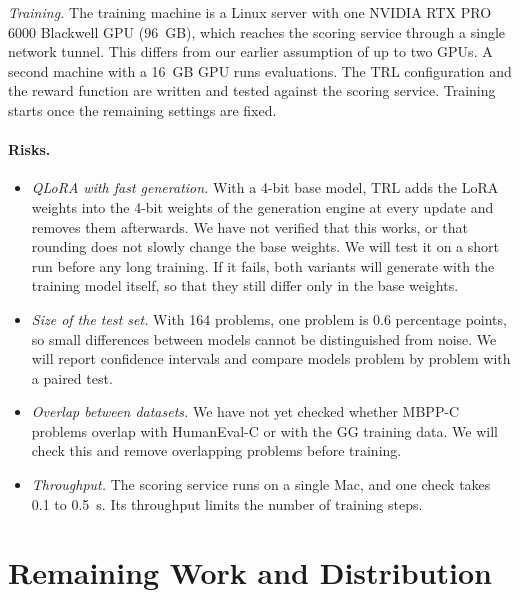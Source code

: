 \documentclass{article}
\begin{document}
\emph{Training.} The training machine is a Linux server with one NVIDIA RTX PRO 6000 Blackwell GPU (96~GB), which reaches the scoring service through a single network tunnel. This differs from our earlier assumption of up to two GPUs. A second machine with a 16~GB GPU runs evaluations. The TRL configuration and the reward function are written and tested against the scoring service. Training starts once the remaining settings are fixed.

\paragraph{Risks.}
\begin{itemize}
  \item \emph{QLoRA with fast generation.} With a 4-bit base model, TRL adds the LoRA weights into the 4-bit weights of the generation engine at every update and removes them afterwards. We have not verified that this works, or that rounding does not slowly change the base weights. We will test it on a short run before any long training. If it fails, both variants will generate with the training model itself, so that they still differ only in the base weights.
  \item \emph{Size of the test set.} With 164 problems, one problem is 0.6 percentage points, so small differences between models cannot be distinguished from noise. We will report confidence intervals and compare models problem by problem with a paired test.
  \item \emph{Overlap between datasets.} We have not yet checked whether MBPP-C problems overlap with HumanEval-C or with the GG training data. We will check this and remove overlapping problems before training.
  \item \emph{Throughput.} The scoring service runs on a single Mac, and one check takes 0.1 to 0.5~s. Its throughput limits the number of training steps.
\end{itemize}

\section{Remaining Work and Distribution}
\label{sec:remaining}
\end{document}
